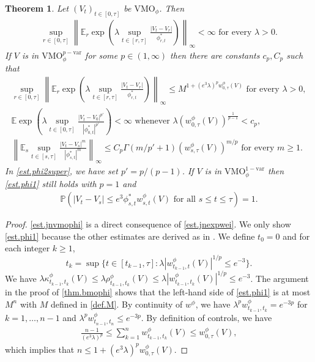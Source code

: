 \documentclass[12pt,oneside,reqno,fleqn]{amsart}
\numberwithin{equation}{section}
\newtheorem{theorem}{Theorem}[section]
\theoremstyle{remark}
\newcommand\mE{{\mathbb E}}
\newcommand\E{\mE}
\newcommand\PP{{\mathbb P}}
\newcommand{\1}{{\mathbf 1}}
\renewcommand{\le}{\leq}
\renewcommand{\ge}{\geq}
\newcommand{\vmo}{{\mathrm{VMO}}}
\newcommand{\var}{{\mathrm{var}}}
\begin{document}
	\begin{theorem}\label{thm.vmo}
		Let $(V_t)_{t\in[0,\tau]}$ be $\vmo_\phi$. Then
		\begin{align}\label{est.jnvmophi}
			\sup_{r\in[0,\tau]}\left\|\E_r \exp\left(\lambda\sup_{t\in[r,\tau]}\frac{|V_t-V_r|}{\phi^*_{r,t}}\right)\right\|_\infty<\infty \text{ for every }\lambda>0.
		\end{align}
		If $V$ is in $\vmo^{p-\var}_\phi$ for some $p\in(1,\infty)$ then there are constants $c_p,C_p$ such that
		\begin{gather}
			\label{est.phi1}
			\sup_{r\in[0,\tau]}\left\|\E_r\exp\left(\lambda \sup_{t\in[r,\tau]}\frac{|V_t-V_r|}{\phi^*_{r,t}} \right)\right\|_\infty\le M^{1+(e^3\lambda)^pw^\phi_{0,\tau}(V)} \text{ for every }  \lambda>0,
			\\
			\E\exp\left(\lambda \sup_{t\in[0,\tau]}\frac{|V_t-V_0|^{p'}}{|\phi^*_{0,t}|^{p'}} \right)<\infty \text{ whenever }  \lambda(w^\phi_{0,\tau}(V))^{\frac1{p-1}}<c_p,
			\label{est.phi2super}
			\\\left\|\E_s\sup_{t\in[s,\tau]}\frac{|V_t-V_s|^m}{|\phi^*_{s,t}|^m}\right\|_\infty\le C_p \Gamma( m/{p'}+1)(w^\phi_{s,\tau}(V))^{m/p} \text{ for every }m\ge1.
		\end{gather}
		In \eqref{est.phi2super}, we have set $p'=p/(p-1)$.
		If $V$ is in $\vmo^{1-\var}_\phi$ then \eqref{est.phi1} still holds with $p=1$ and
		\begin{align}
			\PP(|V_t-V_s|\le e^3 \phi^*_{s,t} w_{s,t}^\phi(V)\text{ for all } s\le t\le \tau)=1.
		\end{align}
	\end{theorem}
	\begin{proof}
		\eqref{est.jnvmophi} is a direct consequence of \eqref{est.jnexpwei}. We only show \eqref{est.phi1} because the other estimates are derived as in \cite[Section 3]{le2022stochastic}.
		We define $t_0=0$ and for each integer $k\ge1$, 
		\[
			t_k=\sup\{t\in[t_{k-1},\tau]:\lambda |w^\phi_{t_{k-1},t}(V)|^{1/p}\le e^{-3}\}.
		\]
		We have $\lambda \kappa^\phi_{t_{k-1},t_k}(V)\le \lambda \rho^\phi_{t_{k-1},t_k}(V)\le \lambda |w^\phi_{t_{k-1},t_k}(V)|^{1/p}\le e^{-3}$. The argument in the proof of \cref{thm.bmophi} shows that the left-hand side of \eqref{est.phi1} is at most $M^n$ with $M$ defined in \eqref{def.M}. 
		By continuity of $w^\phi$, we have $\lambda^p w^\phi_{t_{k-1},t_k}=e^{-3p}$ for $k=1,\ldots,n-1$ and $\lambda^p w^\phi_{t_{n-1},t_n}\le e^{-3p}$. By definition of controls, we have
		\begin{align*}
			\frac{n-1}{(e^{3}\lambda)^p}\le\sum_{k=1}^n w^\phi_{t_{k-1},t_k}(V)\le w^\phi_{0,\tau}(V),
		\end{align*}
		which implies that $n\le 1+(e^{3}\lambda)^p w^\phi_{0,\tau}(V)$. 
	\end{proof}
\end{document}

